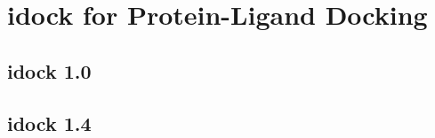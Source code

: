 \chapter{idock for Protein-Ligand Docking}

\section{idock 1.0}



\section{idock 1.4}



\chapterend
